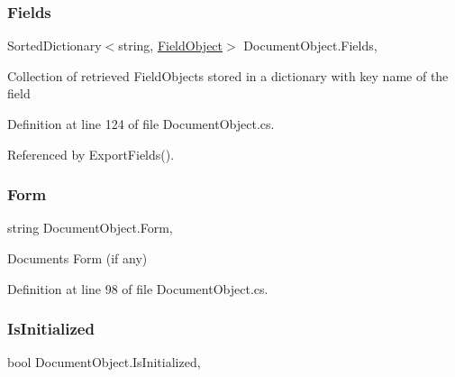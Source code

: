 \mbox{\label{class_document_object_ae203b8a3e40b6c428145d2335b71245c}} 
\subsubsection{\texorpdfstring{Fields}{Fields}}
{\footnotesize\ttfamily Sorted\+Dictionary$<$string, \hyperlink{class_field_object}{Field\+Object}$>$ Document\+Object.\+Fields\hspace{0.3cm}{\ttfamily [get]}, {\ttfamily [set]}}



Collection of retrieved Field\+Objects stored in a dictionary with key name of the field 



Definition at line 124 of file Document\+Object.\+cs.



Referenced by Export\+Fields().

\mbox{\label{class_document_object_ad3444a6c018474405064070fa9a94afe}} 
\subsubsection{\texorpdfstring{Form}{Form}}
{\footnotesize\ttfamily string Document\+Object.\+Form\hspace{0.3cm}{\ttfamily [get]}, {\ttfamily [set]}}



Documents Form (if any) 



Definition at line 98 of file Document\+Object.\+cs.

\mbox{\label{class_document_object_a3b2075b73f38d05091b69decc6ce7992}} 
\subsubsection{\texorpdfstring{Is\+Initialized}{IsInitialized}}
{\footnotesize\ttfamily bool Document\+Object.\+Is\+Initialized\hspace{0.3cm}{\ttfamily [get]}, {\ttfamily [set]}}



